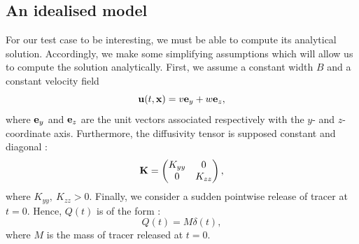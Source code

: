 \subsection*{An idealised model}
For our test case to be interesting, we must be able to compute its analytical solution. Accordingly, we make some simplifying assumptions which will allow us to compute the solution analytically.
First, we assume a constant width $B$ and a constant velocity field
\begin{equation} \label{eq:testcase:velocity}
	\mathbf{u}(t,\mathbf{x}) = v \mathbf e_y + w \mathbf e_z,
\end{equation}
where $\mathbf e_y$ and $\mathbf e_z$ are the unit vectors associated respectively with the $y$- and $z$-coordinate axis. Furthermore, the diffusivity tensor is supposed constant and diagonal :
\begin{equation} \label{eq:testcase:diffusivity}
	\mathbf{K} = \begin{pmatrix}
			K_{yy} & 0 \\
			0 & K_{zz}
			\end{pmatrix},
\end{equation}
where $K_{yy},\ K_{zz} > 0$. Finally, we consider a sudden pointwise release of tracer at $t=0$. Hence, $Q(t)$ is of the form :
\begin{equation}
	Q(t) = M\delta(t),
\end{equation} 
where $M$ is the mass of tracer released at $t=0$.

